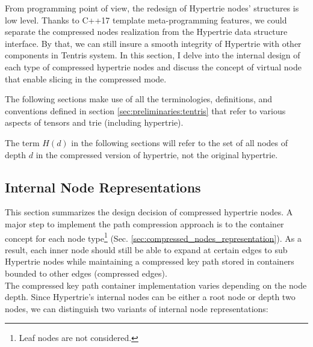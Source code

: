 From programming point of view, the redesign of Hypertrie nodes' structures is low level. Thanks to C++17 template meta-programming features, we could separate the compressed nodes realization from the Hypertrie data structure interface. By that, we can still insure a smooth integrity of Hypertrie with other components in Tentris system. In this section, I delve into the internal design of each type of compressed hypertrie nodes and discuss the concept of virtual node that enable slicing in the compressed mode. \\
\begin{remark}
The following sections make use of all the terminologies, definitions, and conventions defined in section \ref{sec:preliminaries:tentris} that refer to various aspects of tensors and trie (including hypertrie).
\end{remark}

\begin{remark}
	The term $H(d)$ in the following sections will refer to the set of all nodes of depth $d$ in the compressed version of hypertrie, not the original hypertrie.
\end{remark}


\subsection{Internal Node Representations}
\label{ch:approach_node_structure}
This section summarizes the design decision of compressed hypertrie nodes. A major step to implement the path compression approach is to the container concept for each node type\footnote{Leaf nodes are not considered.} (Sec. \ref{sec:compressed_nodes_representation}).
As a result, each inner node should still be able to expand at certain edges to sub Hypertrie nodes while maintaining a compressed key path stored in containers bounded to other edges (compressed edges). \\

The compressed key path container implementation varies depending on the node depth. Since Hypertrie's internal nodes can be either a root node or depth two nodes, we can distinguish two variants of internal node representations: \\

